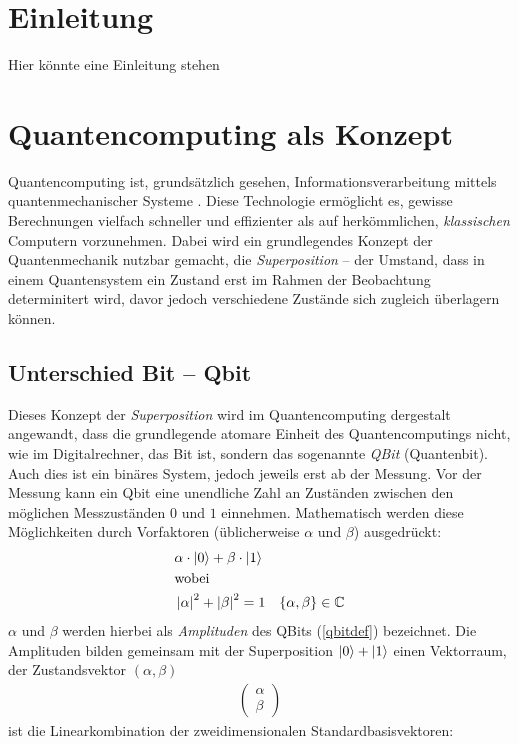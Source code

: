 \renewcommand*{\arraystretch}{1.0} %

\chapter{Einleitung}
Hier könnte eine Einleitung stehen

\chapter{Quantencomputing als Konzept}
Quantencomputing ist, grundsätzlich gesehen, Informationsverarbeitung mittels quantenmechanischer Systeme \cite[1]{NielsenChuang}.
Diese Technologie ermöglicht es, gewisse Berechnungen vielfach schneller und effizienter als auf herkömmlichen, \textit{klassischen} Computern vorzunehmen. Dabei wird ein grundlegendes Konzept der Quantenmechanik nutzbar gemacht, die \textit{Superposition} -- der Umstand, dass in einem Quantensystem ein Zustand erst im Rahmen der Beobachtung determinitert wird, davor jedoch verschiedene Zustände sich zugleich überlagern können. 


\section{Unterschied Bit -- Qbit}
Dieses Konzept der \textit{Superposition} wird im Quantencomputing dergestalt angewandt, dass die grundlegende atomare Einheit des Quantencomputings nicht, wie im Digitalrechner, das Bit ist, sondern das sogenannte \textit{QBit} (Quantenbit).
Auch dies ist ein binäres System, jedoch jeweils erst ab der Messung.
Vor der Messung kann ein Qbit eine unendliche Zahl an Zuständen zwischen den möglichen Messzuständen $0$ und $1$ einnehmen.
Mathematisch werden diese \glqq Möglichkeiten\grqq{} durch Vorfaktoren (üblicherweise $\alpha$ und $\beta$) ausgedrückt:
\begin{align}
&\alpha \cdot \ket{0}+\beta \cdot \ket{1} \label{qbitdef} \\
&\text{wobei}\notag \\ 
&\left\lvert \alpha \right\rvert ^2 + \left\lvert \beta \right\rvert ^2 = 1 & \{ \alpha, \beta \} \in \mathbb{C}
\end{align}
$\alpha$ und $\beta$ werden hierbei als \textit{Amplituden} des QBits (\ref{qbitdef}) bezeichnet.
Die Amplituden bilden gemeinsam mit der Superposition $\ket{0}+\ket{1}$ einen Vektorraum, der Zustandsvektor $(\alpha, \beta)$
\begin{align}
    \begin{pmatrix}
        \alpha\\
        \beta
    \end{pmatrix}
\end{align}
ist die Linearkombination der zweidimensionalen Standardbasisvektoren\cite[22]{Homeister}:

